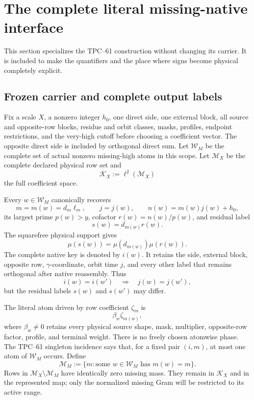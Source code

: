 \section{The complete literal missing-native interface}
\label{sec:tpc68-literal-interface}

This section specializes the TPC--61 construction without changing its
carrier.  It is included to make the quantifiers and the place where signs
become physical completely explicit.

\subsection{Frozen carrier and complete output labels}

Fix a scale \(X\), a nonzero integer \(h_0\), one direct side, one external
block, all source and opposite-row blocks, residue and orbit classes,
masks, profiles, endpoint restrictions, and the very-high cutoff before
choosing a coefficient vector.  The opposite direct side is included by
orthogonal direct sum.  Let \(\mathcal W_M\) be the complete set of actual
nonzero missing-high atoms in this scope.  Let \(\mathcal M_X\) be the
complete declared physical row set and
\begin{equation}
 \mathcal K_X:=\ell^2(\mathcal M_X)
 \label{eq:tpc68-full-coefficient-space}
\end{equation}
the full coefficient space.

Every \(w\in\mathcal W_M\) canonically recovers
\[
 m=m(w)=d_m\ell_m,\qquad
 j=j(w),\qquad
 n(w)=m(w)j(w)+h_0,
\]
its largest prime \(p(w)>y\), cofactor \(r(w)=n(w)/p(w)\), and residual
label
\[
 s(w)=d_{m(w)}r(w).
\]
The squarefree physical support gives
\[
 \mu(s(w))=\mu(d_{m(w)})\mu(r(w)).
\]
The complete native key is denoted by \(i(w)\).  It retains the side,
external block, opposite row, \(\gamma\)-coordinate, orbit time \(j\), and
every other label that remains orthogonal after native reassembly.  Thus
\[
 i(w)=i(w')\quad\Longrightarrow\quad j(w)=j(w'),
\]
but the residual labels \(s(w)\) and \(s(w')\) may differ.

The literal atom driven by row coefficient \(\zeta_m\) is
\[
 \beta_w\zeta_{m(w)},
\]
where \(\beta_w\ne0\) retains every physical source shape, mask, multiplier,
opposite-row factor, profile, and terminal weight.  There is no freely
chosen atomwise phase.  The TPC--61 singleton incidence says that, for a
fixed pair \((i,m)\), at most one atom of \(\mathcal W_M\) occurs.  Define
\[
 \mathcal M_M
 :=\{m:\text{some }w\in\mathcal W_M\text{ has }m(w)=m\}.
\]
Rows in \(\mathcal M_X\setminus\mathcal M_M\) have identically zero
missing mass.  They remain in \(\mathcal K_X\) and in the represented map;
only the normalized missing Gram will be restricted to its active range.

